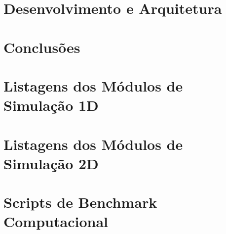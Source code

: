 \documentclass[a4paper,12pt,oneside,openany]{book}
\begin{document}
\chapter{Desenvolvimento e Arquitetura}
\label{cap4}


\chapter{Conclusões}
\label{cap6}


\normalsize
\cleardoublepage
{}



   \appendix
   \chapter{Listagens dos Módulos de Simulação 1D}
   \label{ApendiceA}
   
   \chapter{Listagens dos Módulos de Simulação 2D}
   \label{ApendiceB}
   
   \chapter{Scripts de Benchmark Computacional}
   \label{apend:benchmark}
   

\backmatter
\end{document}
